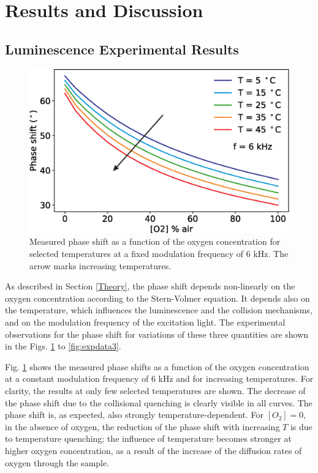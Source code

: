 \documentclass[sensors,article,submit,moreauthors,pdftex,10pt,a4paper]{Definitions/mdpi}
\begin{document}
\section{Results and Discussion}
\label{Results}

\subsection{Luminescence Experimental Results}

\begin{figure}[b!]
\centering
\includegraphics[width=8.2 cm]{phase_O2_T.eps}
\caption{Measured phase shift as a function of the oxygen concentration for selected temperatures at a fixed modulation frequency of 6 kHz. The arrow marks increasing temperatures.}
\label{fig:expdata1}
\end{figure}

As described in Section \ref{Theory}, the phase shift depends non-linearly on the oxygen concentration according to the Stern-Volmer equation. It depends also on the temperature, which influences the luminescence and the collision mechanisms, and on the modulation frequency of the excitation light. The experimental observations for the phase shift for variations of these three quantities are shown in the Figs. \ref{fig:expdata1} to \ref{fig:expdata3}.

Fig. \ref{fig:expdata1} shows the measured phase shifts as a function of the oxygen concentration at a constant modulation frequency of 6 kHz and for increasing temperatures. For clarity, the results at only few selected temperatures are shown. The decrease of the phase shift due to the collisional quenching is clearly visible in all curves. The phase shift is, as expected, also strongly  temperature-dependent. For $[O_2]=0$, in the absence of oxygen, the reduction of the phase shift with increasing $T$ is due to temperature quenching; the influence of temperature becomes stronger at higher oxygen concentration, as a result of the increase of the diffusion rates of oxygen through the sample.
\end{document}

